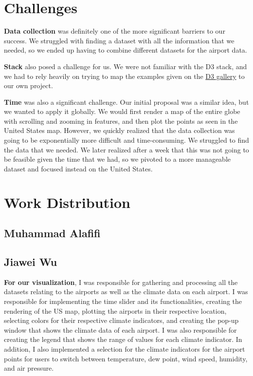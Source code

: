 \documentclass[9pt,twocolumn,twoside]{opticajnl}
\begin{document}
\section {Challenges}

\textbf{Data collection} was definitely one of the more significant barriers to our success. We struggled with finding a dataset with all the information that we needed, so we ended up having to combine different datasets for the airport data.

\textbf{Stack} also posed a challenge for us. We were not familiar with the D3 stack, and we had to rely heavily on trying to map the examples given on the \href{https://observablehq.com/@d3/gallery}{D3 gallery} to our own project.

\textbf{Time} was also a significant challenge. Our initial proposal was a similar idea, but we wanted to apply it globally. We would first render a map of the entire globe with scrolling and zooming in features, and then plot the points as seen in the United States map. However, we quickly realized that the data collection was going to be exponentially more difficult and time-consuming. We struggled to find the data that we needed. We later realized after a week that this was not going to be feasible given the time that we had, so we pivoted to a more manageable dataset and focused instead on the United States.

\section {Work Distribution}

\subsection {Muhammad Alafifi}

\subsection {Jiawei Wu}

\textbf{For our visualization}, I was responsible for gathering and processing all the datasets relating to the airports as well as the climate data on each airport. I was responsible for implementing the time slider and its functionalities, creating the rendering of the US map, plotting the airports in their respective location, selecting colors for their respective climate indicators, and creating the pop-up window that shows the climate data of each airport. I was also responsible for creating the legend that shows the range of values for each climate indicator. In addition, I also implemented a selection for the climate indicators for the airport points for users to switch between temperature, dew point, wind speed, humidity, and air pressure.
\end{document}
